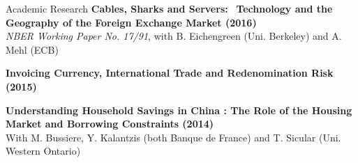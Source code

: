 \documentclass[usegeometry, 10pt, a4paper]{cv} %
\newcommand{\activite}[1]{\textbf{#1}\ }
\begin{document}
\begin{rubriquetableau}[0.95\textwidth]{Academic Research}
\activite{Cables, Sharks and Servers:}
\activite{Technology and the Geography of the Foreign Exchange Market (2016)}\\
\hspace{0.6cm} \small{\emph{NBER Working Paper No. 17/91}, with B. Eichengreen (Uni. Berkeley) and A. Mehl (ECB)}
\vspace{0.4cm} 
    
\activite{Invoicing Currency, International Trade and Redenomination Risk (2015)} \\
\vspace{0.2cm} 

\activite{Understanding Household Savings in China : The Role of the Housing Market and Borrowing Constraints (2014)}  \\
\hspace{0.6cm} \small{With M. Bussiere, Y. Kalantzis (both Banque de France) and T. Sicular (Uni. Western
  Ontario)} \\
\end{rubriquetableau}



\vspace{0.8cm}
\end{document}
